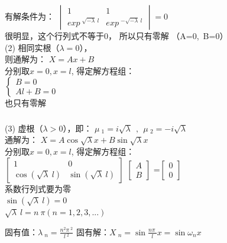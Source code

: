 \begin{frame}
\frametitle{}	
	有解条件为：
	$\begin{vmatrix}
		1&1\\
		exp~^{\sqrt{-\lambda}~l} &exp~^{-\sqrt{-\lambda}~l}
	\end{vmatrix}
	= 0$\\
	很明显，这个行列式不等于0， 所以只有零解 （A=0,~B=0）    \\ \vspace{0.3cm}
	(2) 相同实根（$\lambda = 0$），\\
	则通解为：	{ $\displaystyle 	X=Ax + B $ } \\ 
	分别取$x=0, x=l$, 得定解方程组：\\
	{$\displaystyle \left\{
	\begin{array}{lll}
		B=0\\
		Al+B=0
	\end{array} \right. $}\\
	也只有零解  \\
\end{frame}	

\begin{frame}
	\frametitle{}	
	(3) 虚根（$\lambda >0$），即： $ \mu~_1=i\sqrt{\lambda}~~,~~\mu~_2=-i\sqrt{\lambda}$	\\
	通解为：	{ $\displaystyle 	X=A\cos \sqrt{\lambda}x+ B\sin \sqrt{\lambda}x $ } \\ 
	分别取$x=0, x=l$, 得定解方程组：\\
	$\left[
	\begin{array}{lll}
		1&0\\
		\cos( {\sqrt{\lambda}~l}) &\sin ({\sqrt{\lambda}~l})
	\end{array}
	\right]$
	$\left[
	\begin{array}{ll}
		A\\
		B
	\end{array}
	\right]$
	=$\left[
	\begin{array}{ll}
		0\\
		0
	\end{array}
	\right]$\\ 
	系数行列式要为零\\
	$ \sin ({\sqrt{\lambda}~l})=0$ \\
	$ \sqrt{\lambda}~l=n~\pi  (n=1,2,3,...) $\\ 
	\begin{enumerate}
		\IItem 固有值：$\displaystyle  \lambda~_n=\frac{n^2\pi~^2}{l~^2}$ 
		\IItem 固有解：{\large $\displaystyle  X~_n=\sin \frac{n\pi~}{l} x=\sin \omega_n x $}
	\end{enumerate}	
\end{frame}	

